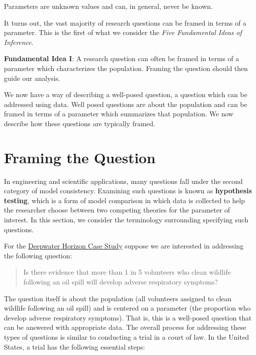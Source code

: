 \documentclass[]{book}
\theoremstyle{plain}
\theoremstyle{mydefn}
\theoremstyle{myexmpl}
\theoremstyle{remark}
\let\BeginKnitrBlock\begin \let\EndKnitrBlock\end
\let\BeginKnitrBlock\begin \let\EndKnitrBlock\end
\begin{document}
\BeginKnitrBlock{rmdkeyidea}
Parameters are unknown values and can, in general, never be known.
\EndKnitrBlock{rmdkeyidea}

It turns out, the vast majority of research questions can be framed in
terms of a parameter. This is the first of what we consider the
\emph{Five Fundamental Ideas of Inference}.

\BeginKnitrBlock{rmdfivefund}
\textbf{Fundamental Idea I}: A research question can often be framed in
terms of a parameter which characterizes the population. Framing the
question should then guide our analysis.
\EndKnitrBlock{rmdfivefund}

We now have a way of describing a well-posed question, a question which
can be addressed using data. Well posed questions are about the
population and can be framed in terms of a parameter which summarizes
that population. We now describe how these questions are typically
framed.

\section{Framing the Question}\label{framing-the-question}

In engineering and scientific applications, many questions fall under
the second category of model consistency. Examining such questions is
known as \textbf{hypothesis testing}, which is a form of model
comparison in which data is collected to help the researcher choose
between two competing theories for the parameter of interest. In this
section, we consider the terminology surrounding specifying such
questions.

For the \protect\hyperlink{CaseDeepwater}{Deepwater Horizon Case Study}
suppose we are interested in addressing the following question:

\begin{quote}
Is there evidence that more than 1 in 5 volunteers who clean wildlife
following an oil spill will develop adverse respiratory symptoms?
\end{quote}

The question itself is about the population (all volunteers assigned to
clean wildlife following an oil spill) and is centered on a parameter
(the proportion who develop adverse respiratory symptoms). That is, this
is a well-posed question that can be answered with appropriate data. The
overall process for addressing these types of questions is similar to
conducting a trial in a court of law. In the United States, a trial has
the following essential steps:
\end{document}
